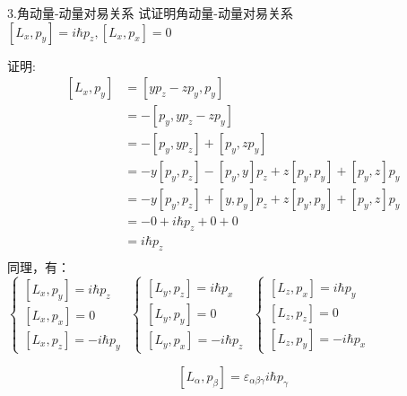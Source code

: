 \begin{frame} [allowframebreaks=]
    \frametitle{}
    \begin{tcolorbox1}{3.角动量-动量对易关系}
        试证明角动量-动量对易关系 $[L_x,p_y]=i\hbar p_z,  [L_x,p_x]=0$
    \end{tcolorbox1}
    \alert{证明:} 
    \begin{equation*}
        \begin{split}
        [L_x,p_y]&= [yp_z-zp_y,p_y]\\
        &=-[p_y,yp_z-zp_y]\\
        &=-[p_y,yp_z] + [p_y,zp_y]\\
        &=-y[p_y,p_z] -[p_y,y]p_z + z[p_y,p_y] + [p_y,z]p_y\\
        &=-y[p_y,p_z] +[y,p_y]p_z + z[p_y,p_y] + [p_y,z]p_y\\
        &=-0 + i\hbar p_z + 0+0\\
        &=i\hbar p_z \\
        \end{split}  
    \end{equation*}
    同理，有：\\
    $\begin{cases}
        [L_x,p_y]= i\hbar p_z  \\ 
        [L_x,p_x]= 0  \\ 
        [L_x,p_z]= -i\hbar p_y 
    \end{cases}$
    $\begin{cases}
        [L_y,p_z]= i\hbar p_x  \\ 
        [L_y,p_y]= 0  \\ 
        [L_y,p_x]= -i\hbar p_z 
    \end{cases}$
    $\begin{cases}
        [L_z,p_x]= i\hbar p_y  \\ 
        [L_z,p_z]= 0  \\ 
        [L_z,p_y]= -i\hbar p_x 
    \end{cases}$
    \begin{tcolorbox}[colback=yellow!5,colframe=red!75!black,title=角动量-动量对易关系]
        $$ [L_\alpha,p_\beta]= \varepsilon_{\alpha\beta\gamma} i\hbar p_\gamma $$ 
    \end{tcolorbox}
\end{frame} 

